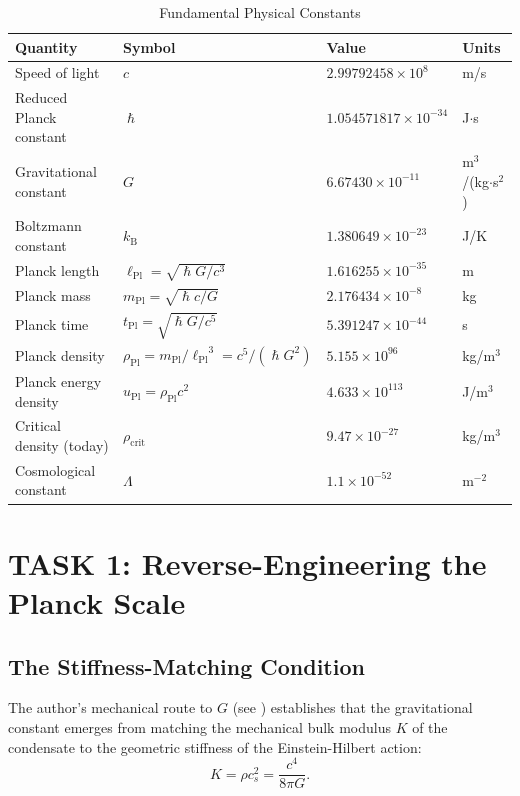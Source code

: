 \documentclass[11pt,a4paper]{article}
\newcommand{\ee}[1]{\times 10^{#1}}
\newcommand{\hbar}{\ensuremath{\hslash}}
\newcommand{\kB}{\ensuremath{k_{\mathrm{B}}}}
\newcommand{\lPl}{\ensuremath{\ell_{\mathrm{Pl}}}}
\newcommand{\mPl}{\ensuremath{m_{\mathrm{Pl}}}}
\newcommand{\tPl}{\ensuremath{t_{\mathrm{Pl}}}}
\newcommand{\rhocrit}{\ensuremath{\rho_{\mathrm{crit}}}}
\newcommand{\rhoPl}{\ensuremath{\rho_{\mathrm{Pl}}}}
\theoremstyle{definition}
\begin{document}
\begin{table}[H]
\centering
\caption{Fundamental Physical Constants}
\label{tab:constants}
\begin{tabular}{@{}llll@{}}
\toprule
\textbf{Quantity} & \textbf{Symbol} & \textbf{Value} & \textbf{Units} \\
\midrule
Speed of light & $c$ & $2.99792458 \ee{8}$ & m/s \\
Reduced Planck constant & $\hbar$ & $1.054571817 \ee{-34}$ & J$\cdot$s \\
Gravitational constant & $G$ & $6.67430 \ee{-11}$ & m$^3$/(kg$\cdot$s$^2$) \\
Boltzmann constant & $\kB$ & $1.380649 \ee{-23}$ & J/K \\
Planck length & $\lPl = \sqrt{\hbar G/c^3}$ & $1.616255 \ee{-35}$ & m \\
Planck mass & $\mPl = \sqrt{\hbar c/G}$ & $2.176434 \ee{-8}$ & kg \\
Planck time & $\tPl = \sqrt{\hbar G/c^5}$ & $5.391247 \ee{-44}$ & s \\
Planck density & $\rhoPl = \mPl/\lPl^3 = c^5/(\hbar G^2)$ & $5.155 \ee{96}$ & kg/m$^3$ \\
Planck energy density & $u_{\mathrm{Pl}} = \rhoPl c^2$ & $4.633 \ee{113}$ & J/m$^3$ \\
\midrule
Critical density (today) & $\rhocrit$ & $9.47 \ee{-27}$ & kg/m$^3$ \\
Cosmological constant & $\Lambda$ & $1.1 \ee{-52}$ & m$^{-2}$ \\
\bottomrule
\end{tabular}
\end{table}

\section{TASK 1: Reverse-Engineering the Planck Scale}
\label{sec:task1}

\subsection{The Stiffness-Matching Condition}
\label{sec:stiffness_matching}

The author's mechanical route to $G$ (see \cite{SkavbergMechG2025}) establishes that the gravitational constant emerges from matching the mechanical bulk modulus $K$ of the condensate to the geometric stiffness of the Einstein-Hilbert action:
\begin{equation}
\label{eq:stiffness_match}
K = \rho c_s^2 = \frac{c^4}{8\pi G}.
\end{equation}
\end{document}

